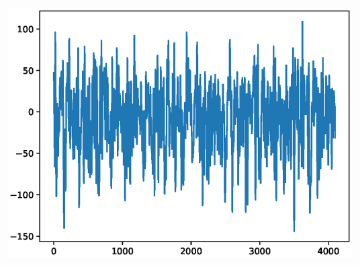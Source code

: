 \documentclass[12pt]{article}
\begin{document}
\begin{figure}
\begin{subfigure}{.25\textwidth}
\end{subfigure}%
\begin{subfigure}{.25\textwidth}
  \centering
  \includegraphics[width=.8\linewidth]{figures/signals/D/F035.eps}
\end{subfigure}


\end{figure}
\end{document}
